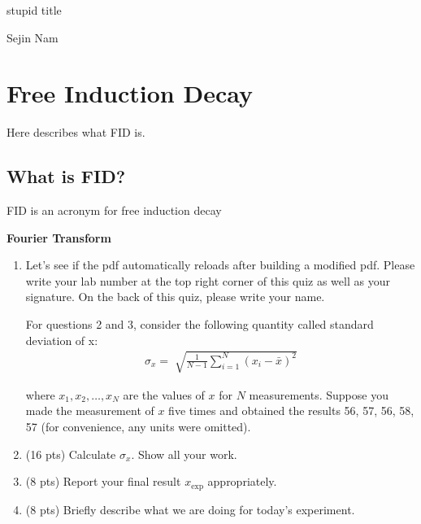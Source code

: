 \documentclass[letterpaper, 11pt]{article}
\begin{document}
\begin{titlepage}
	\begin{center}
		stupid title\\
		[10cm]
	\end{center}

	\begin{flushright}
		Sejin Nam
	\end{flushright}
\end{titlepage}

\tableofcontents
\clearpage

\section{Free Induction Decay}
Here describes what FID is. \lipsum[1]
\subsection{What is FID?}
FID is an acronym for free induction decay
\begin{center}
\textbf{\large Fourier Transform}
\end{center}
\begin{enumerate}
	\item Let's see if the pdf  automatically reloads after building a modified pdf. Please write your lab number at the top right corner of this quiz as well as your signature. On the back of this quiz, please write your name.\vspace{0.25cm}

For questions 2 and 3, consider the following quantity called standard deviation of x:
	\begin{align}
			\sigma_{x} = \sqrt[]{\frac{1}{N - 1} \sum_{i = 1}^{N} (x_{i} - \bar{x})^{2}}
	\end{align}
	
where \(x_{1}, x_{2}, \dots, x_{N}\) are the values of \(x\) for \(N\) measurements. Suppose you made the measurement of \(x\) five times and obtained the results 56, 57, 56, 58, 57 (for convenience, any units were omitted).

	\item (16 pts) Calculate \(\sigma_{x}\). Show all your work. 
	
	\item (8 pts) Report your final result \(x_{\text{exp}}\) appropriately. 
	
	\item (8 pts) Briefly describe what we are doing for today's experiment.   
\end{enumerate}
\printindex
\end{document}
